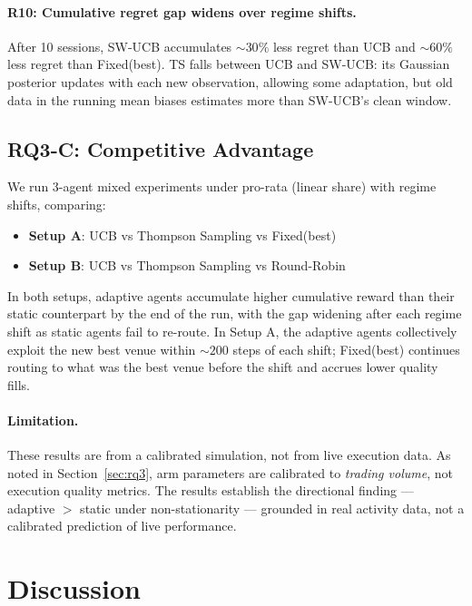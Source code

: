 \documentclass[11pt]{article}
\begin{document}
\paragraph{R10: Cumulative regret gap widens over regime shifts.}
After 10 sessions, SW-UCB accumulates $\sim 30\%$ less regret than UCB
and $\sim 60\%$ less regret than Fixed(best).
TS falls between UCB and SW-UCB: its Gaussian posterior updates with each
new observation, allowing some adaptation, but old data in the running
mean biases estimates more than SW-UCB's clean window.

\subsection{RQ3-C: Competitive Advantage}

We run 3-agent mixed experiments under pro-rata (linear share) with regime
shifts, comparing:
\begin{itemize}
\item \textbf{Setup A}: UCB vs Thompson Sampling vs Fixed(best)
\item \textbf{Setup B}: UCB vs Thompson Sampling vs Round-Robin
\end{itemize}

In both setups, adaptive agents accumulate higher cumulative reward than
their static counterpart by the end of the run, with the gap widening
after each regime shift as static agents fail to re-route.
In Setup A, the adaptive agents collectively exploit the new best venue
within $\sim 200$ steps of each shift; Fixed(best) continues routing to
what was the best venue before the shift and accrues lower quality fills.

\paragraph{Limitation.}
These results are from a calibrated simulation, not from live execution
data.
As noted in Section~\ref{sec:rq3}, arm parameters are calibrated to
\emph{trading volume}, not execution quality metrics.
The results establish the directional finding --- adaptive $>$ static
under non-stationarity --- grounded in real activity data, not a
calibrated prediction of live performance.

\section{Discussion}
\label{sec:discussion}
\end{document}
